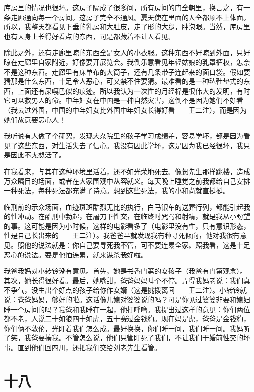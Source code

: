 库房里的情况也很坏。这房子隔成了很多间，所有房间的门全朝里，换言之，有一条走廊通向每一个房间。这房子完全不通风。夏天使在里面的人全都顾不上体面。所以，我整天都看见下垂的乳房和大肚皮，走了形的大腿，肿泡眼。当然，库房里也有人身上长得好看点的东西，可是都藏着不让人看见。 

除此之外，还有走廊里晾的东西全是女人的小衣服。这种东西不好晾到外面，只好晾在走廊里自家附近，好像要开展览会。我倒乐意看见年轻姑娘的乳罩裤权，怎奈不是这种东西。走廊里有床单布的大筒子，还有几条带子连起来的面口袋。假如要猜那是什么东西，十足令人恶心，可又禁不住要猜。最难看的是一种毡鞋垫式的东西，上面还有屎嘎巴似的痕迹。所以我认为一次性的月经棉是很伟大的发明，有时它可以救男人的命。中年妇女在中国是一种自然灾害，这倒不是因为她们不好看（我去过外国，中国的中年妇女比外国中年妇女长得好看——王二注），而是因为她们故意要恶心人！ 


我听说有人做了个研究，发现大杂院里的孩子学习成绩差，容易学坏，都是因为看见了这些东西，对生活失去了信心。我没有因此学坏，这是因为我已经很坏，我只是因此不太想活了。 

在我看来，与其在这种环境里活着，还不如光荣地死去。像贺先生那样跳楼，造成万众瞩目的场面，或者在大家围观中从容就义。每天晚上睡觉之前我都给自己安排一种死法，每种死法都充满了诗意。想到这些死法，我的小和尚就直挺挺。 

临刑前的示众场面，血迹斑斑酷烈无比的执行，白马银车的送葬行列，都能引起我的性冲动。在酷刑中勃起，在屠刀下性交，在临终时咒骂和射精，就是我从小盼望的事。这可能是因为小时候，这样的电影看多了（电影里没有性，只有意识形态，性是自己长出来的——王二注）。我爸爸早就发现我有种寻死倾向，他对我很有意见。照他的说法就是：你自己要寻死我不管，可不要连累全家。照我看，这是十足恶心的说法。要是他怕连累，就来谋杀我好啦。 

我爸我妈对小转铃没有意见。首先，她是书香门第的女孩子（我爸有门第观念）。其次，她长得很好看。最后，她嘴甜，爸爸妈妈叫个不停。弄得我妈老说：我们真不争气，没生出个好点的孩子给你作女婿（这是挑拨离间——王二注）。小转铃就说：爸爸妈妈，够好的啦。这话像儿媳对婆婆说的吗？可是你见过婆婆非要和媳妇睡一个房间的吗？我爸和我睡在一起，他打呼噜。我提出过这样的意见：你们两位都不老，人说二十如狼四十如虎，五十赛过金钱豹。现在妈是虎，爸爸是金钱豹，你们俩不敦伦，光盯着我们怎么成。最好换换，你们睡一间，我们睡一间。我妈听了笑，我爸要揍我。不管怎么说，他们只管盯死了我们，不让我们干婚前性交的坏事。直到他们回四川，还把我们交给刘老先生看管。

\section{十八}

